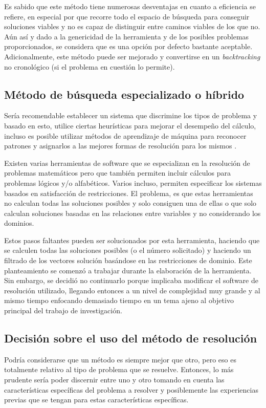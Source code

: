 Es sabido que este método tiene numerosas desventajas en cuanto a eficiencia
se refiere, en especial por que recorre todo el espacio de búsqueda para
conseguir soluciones viables y no es capaz de distinguir entre caminos viables
de los que no. Aún así y dado a la genericidad de la herramienta y de los
posibles problemas proporcionados, se considera que es una opción por defecto
bastante aceptable. Adicionalmente, este método puede ser mejorado
y convertirse en un \emph{backtracking} no cronológico \cite{RN09} (si el problema
en cuestión lo permite).

\subsection{Método de búsqueda especializado o híbrido}
Sería recomendable establecer un sistema que discrimine los tipos de
problema y basado en esto, utilice ciertas heurísticas para mejorar
el desempeño del cálculo, incluso es posible utilizar métodos de
aprendizaje de máquina para reconocer patrones y asignarlos a las mejores
formas de resolución para los mismos \cite{M97}.

Existen varias herramientas de software que se especializan en la resolución
de problemas matemáticos pero que también permiten incluir cálculos para
problemas lógicos y/o alfabéticos. Varios incluso, permiten especificar
los sistemas basados en satisfacción de restricciones. El problema, es que 
estas herramientas no calculan todas las soluciones posibles y solo
consiguen una de ellas o que solo calculan soluciones basadas en las relaciones
entre variables y no considerando los dominios.

Estos pasos faltantes pueden ser solucionados por esta herramienta, haciendo
que se calculen todas las soluciones posibles (o el número solicitado) y 
haciendo un filtrado de los vectores solución basándose en las restricciones
de dominio. Este planteamiento se comenzó a trabajar durante la elaboración
de la herramienta. Sin embargo, se decidió no continuarlo porque implicaba 
modificar el software de resolución utilizado, llegando entonces a un nivel 
de complejidad muy grande y al mismo tiempo enfocando demasiado tiempo en un
tema ajeno al objetivo principal del trabajo de investigación.

\subsection{Decisión sobre el uso del método de resolución}
Podría considerarse que un método es siempre mejor que otro, pero eso es 
totalmente relativo al tipo de problema que se resuelve. Entonces, lo más prudente sería
poder discernir entre uno y otro tomando en cuenta las características 
específicas del problema a resolver y posiblemente las experiencias
previas que se tengan para estas características específicas.

